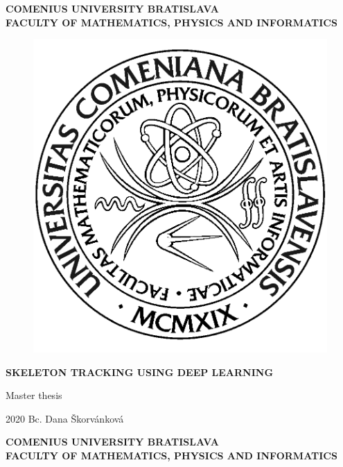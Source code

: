 \documentclass[12pt, a4paper, oneside]{book}
\newcommand\mftitle{Skeleton Tracking using Deep Learning}
\newcommand\mfthesistype{Master thesis}
\newcommand\mfauthor{Bc. Dana Škorvánková}
\newcommand\mfuniversity{COMENIUS UNIVERSITY BRATISLAVA}
\newcommand\mffaculty{FACULTY OF MATHEMATICS, PHYSICS AND INFORMATICS}
\begin{document}
\frontmatter

\thispagestyle{empty}

\noindent
\begin{minipage}{\textwidth}
\begin{center}
\textbf{\mfuniversity \\
\mffaculty}
\end{center}
\end{minipage}

\vfill
\begin{figure}[!hbt]
	\begin{center}
		\includegraphics{images/logo_fmph}
		\label{img:logo}
	\end{center}
\end{figure}
\begin{center}
	\begin{minipage}{0.8\textwidth}
		\centerline{\textbf{\Large\MakeUppercase{\mftitle}}}
		\smallskip
		\centerline{\mfthesistype}
	\end{minipage}
\end{center}
\vfill
2020 \hfill
\mfauthor
\eject 

\thispagestyle{empty}

\noindent
\begin{minipage}{\textwidth}
\begin{center}
\textbf{\mfuniversity \\
\mffaculty}
\end{center}
\end{minipage}
\end{document}
